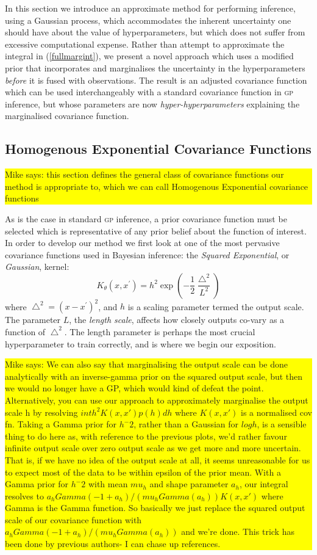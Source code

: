 \documentclass{article}
\newcommand\mikesays[1]{\colorbox{yellow}{\parbox{\columnwidth}{Mike says: #1}}}
\begin{document}
In this section we introduce an approximate method for performing inference, using a Gaussian process, which accommodates the inherent uncertainty one should have about the value of hyperparameters, but which does not suffer from excessive computational expense. Rather than attempt to approximate the integral in (\ref{fullmargint}), we present a novel approach which uses a modified prior that incorporates and marginalises the uncertainty in the hyperparameters \emph{before} it is fused with observations. The result is an adjusted covariance function which can be used interchangeably with a standard covariance function in {\scshape gp} inference, but whose parameters are now \emph{hyper-hyperparameters} explaining the marginalised covariance function.

\subsection{Homogenous Exponential Covariance Functions} \mikesays{this section defines the general class of covariance functions our method is appropriate to, which we can call Homogenous Exponential covariance functions}

As is the case in standard {\scshape gp} inference, a prior covariance function must be selected which is representative of any prior belief about the function of interest. In order to develop our method we first look at one of the most pervasive covariance functions used in Bayesian inference: the \emph{Squared Exponential}, or \emph{Gaussian}, kernel:
\begin{equation}
K_\theta(x,x^\prime) = h^2 \exp \left( -\frac{1}{2} \frac{\bigtriangleup^2}{L^2} \right)
\end{equation}
where $\bigtriangleup^2 = (x - x^\prime)^2$, and $h$ is a scaling parameter termed the output scale. The parameter $L$, the \emph{length scale}, affects how closely outputs co-vary as a function of $\bigtriangleup^2$. The length parameter is perhaps the most crucial hyperparameter to train correctly, and is where we begin our exposition.

\mikesays{We can also say that marginalising the output scale can be done
analytically with an inverse-gamma prior on the squared output scale,
but then we would no longer have a GP, which would kind of defeat the
point. Alternatively, you can use our approach to approximately
marginalise the output scale h by resolving
$int h^2 K(x, x') p(h) dh$
where $K(x, x')$ is a normalised cov fn. Taking a Gamma prior for $h^-2$,
rather than a Gaussian for  $log h$, is a sensible thing to do here as,
with reference to the previous plots, we'd rather favour infinite
output scale over zero output scale as we get more and more uncertain.
That is, if we have no idea of the output scale at all, it seems
unreasonable for us to expect most of the data to be within epsilon of
the prior mean. With a Gamma prior for $h^-2$ with mean $mu_h$ and shape
parameter $a_h$, our integral resolves to
$a_h Gamma(-1 + a_h) / (mu_h Gamma(a_h) ) K(x, x')$
where Gamma is the Gamma function. So basically we just replace the
squared output scale of our covariance function with $a_h Gamma(-1 +
a_h) / (mu_h Gamma(a_h) )$ and we're done. This trick has been done by previous authors- I can chase up references.}
\end{document}
